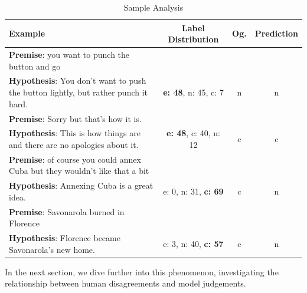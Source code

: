 \begin{table}[t]
\centering
\small
\begin{tabular}{p{8cm}|c|c|c}
\toprule
\textbf{Example} & \textbf{Label Distribution} & \textbf{Og.} & \textbf{Prediction} \\
\midrule
\textbf{Premise}: you want to punch the button and go\\
\textbf{Hypothesis}: You don't want to push the button lightly, but rather punch it hard. & \textbf{e: 48}, n: 45, c: 7 & n & n \\
\midrule
\textbf{Premise}: Sorry but that's how it is.\\
\textbf{Hypothesis}: This is how things are and there are no apologies about it. & \textbf{e: 48}, c: 40, n: 12 & c & c \\
\midrule
\textbf{Premise}: of course you could annex Cuba but they wouldn't like that a bit\\
\textbf{Hypothesis}: Annexing Cuba is a great idea. & e: 0, n: 31, \textbf{c: 69} & c & n \\
\midrule
\textbf{Premise}: Savonarola burned in Florence\\
\textbf{Hypothesis}: Florence became Savonarola's new home. & e: 3, n: 40, \textbf{c: 57} & c & n \\
\bottomrule
\end{tabular}
\caption{Sample Analysis}
\label{tab:sample_analysis}
\end{table}

In the next section, we dive further into this phenomenon, investigating the relationship between human disagreements and model judgements.


